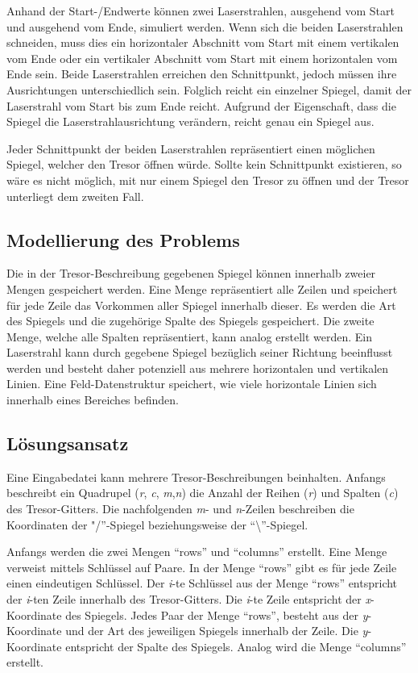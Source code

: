 Anhand der Start-/Endwerte können zwei Laserstrahlen, ausgehend vom Start und ausgehend vom Ende, simuliert werden. Wenn sich die beiden Laserstrahlen schneiden, muss dies ein horizontaler Abschnitt vom Start mit einem vertikalen vom Ende oder ein vertikaler Abschnitt vom Start mit einem horizontalen vom Ende sein. Beide Laserstrahlen erreichen den Schnittpunkt, jedoch müssen ihre Ausrichtungen unterschiedlich sein. Folglich reicht ein einzelner Spiegel, damit der Laserstrahl vom Start bis zum Ende reicht. Aufgrund der Eigenschaft, dass die Spiegel die Laserstrahlausrichtung verändern, reicht genau ein Spiegel aus. 

Jeder Schnittpunkt der beiden Laserstrahlen repräsentiert einen möglichen Spiegel, welcher den Tresor öffnen würde. Sollte kein Schnittpunkt existieren, so wäre es nicht möglich, mit nur einem Spiegel den Tresor zu öffnen und der Tresor unterliegt dem zweiten Fall.
%
\subsection{Modellierung des Problems}
\label{subsec:TextBefehle}
Die in der Tresor-Beschreibung gegebenen Spiegel können innerhalb zweier Mengen gespeichert werden. Eine Menge repräsentiert alle Zeilen und speichert für jede Zeile das Vorkommen aller Spiegel innerhalb dieser. Es werden die Art des Spiegels und die zugehörige Spalte des Spiegels gespeichert. Die zweite Menge, welche alle Spalten repräsentiert, kann analog erstellt werden. Ein Laserstrahl kann durch gegebene Spiegel bezüglich seiner Richtung beeinflusst werden und besteht daher potenziell aus mehrere horizontalen und vertikalen Linien. Eine Feld-Datenstruktur speichert, wie viele horizontale Linien sich innerhalb eines Bereiches befinden.
%
\subsection{Lösungsansatz}
\label{subsec:Abb}
Eine Eingabedatei kann mehrere Tresor-Beschreibungen beinhalten. Anfangs beschreibt ein Quadrupel (\textit{r}, \textit{c}, \textit{m},\textit{n}) die Anzahl der Reihen (\textit{r}) und Spalten (\textit{c}) des Tresor-Gitters. Die nachfolgenden \textit{m}- und \textit{n}-Zeilen beschreiben die Koordinaten der "\slash”-Spiegel beziehungsweise der “\textbackslash”-Spiegel.

Anfangs werden die zwei Mengen “rows” und “columns” erstellt. Eine Menge verweist mittels Schlüssel auf Paare. In der Menge “rows” gibt es für jede Zeile einen eindeutigen Schlüssel. Der \textit{i}-te Schlüssel aus der Menge “rows” entspricht der \textit{i}-ten Zeile innerhalb des Tresor-Gitters. Die \textit{i}-te Zeile entspricht der \textit{x}-Koordinate des Spiegels. Jedes Paar der Menge “rows”, besteht aus der \textit{y}-Koordinate und der Art des jeweiligen Spiegels innerhalb der Zeile. Die \textit{y}-Koordinate entspricht der Spalte des Spiegels. Analog wird die Menge “columns” erstellt. 

